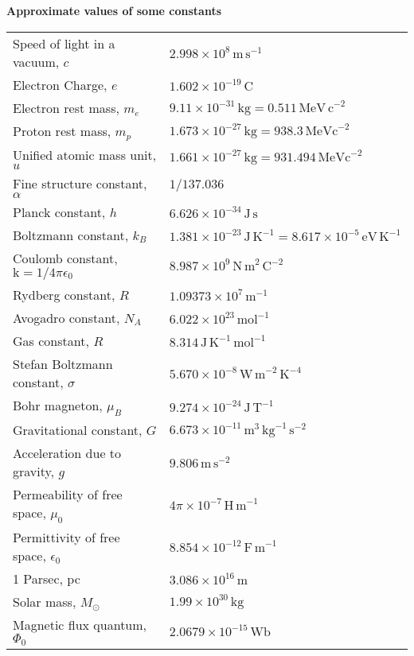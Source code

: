 \documentclass[12pt]{article}
\newcommand{\units}[1]{\ensuremath{\,\mathrm{#1}}}
\begin{document}
	
	\newpage
	\noindent\textbf{Approximate values of some constants}\\[10truept]
	{
	\begin{tabular}{l@{\hspace{1.0truecm}}l}
		Speed of light in a vacuum, $c$ & $2.998\times10^8\units{m\,s}^{-1}$\\
		Electron Charge, $e$  & $1.602\times10^{-19} \units{C}$\\
		Electron rest mass,   $m_e$ & $9.11 \times10^{-31} \units{kg}=
		0.511\units{MeV\,c}^{-2}$\\
		Proton rest mass, $m_p$& $1.673 \times 10^{-27}\units{kg}   =  938.3 \units{MeV c}^{-2}$\\
		Unified atomic mass unit, $u$&   $1.661 \times 10^{-27} \units{kg}  =  931.494
		\units{MeV c}^{-2}$\\
		Fine structure constant, $\alpha$ & $1/137.036  $\\
		Planck constant, $h$ & $6.626 \times 10^{-34}\units{J\,s}$\\
		Boltzmann constant, $k_B$ & $1.381 \times 10^{-23}\units{J\,K}^{-1} =  8.617
		\times 10^{-5}\units{eV\,K}^{-1}$\\
		Coulomb constant, $\mathrm{k}=1/4\pi\epsilon_0$ & $8.987 \times 10^9\units{N\,m}^2\units{C}^{-2}$\\
		Rydberg constant, $R$& $1.09373 \times 10^7 \units{m}^{-1}$\\
		Avogadro constant, $N_A$& $6.022 \times 10^{23} \units{mol}^{-1}$\\
		Gas constant, $R$&$8.314\units{J\,K}^{-1}\units{mol}^{-1}$\\
		Stefan Boltzmann constant, $\sigma$ & $5.670 \times 10^{-8}\units{W\,m}^{-2}\units{K}^{-4}$\\
		Bohr magneton, $\mu_B$& $9.274 \times 10^{-24}\units{J\,T}^{-1}$\\
		Gravitational constant, $ G$& $6.673 \times
		10^{-11}\units{m}^3\units{kg}^{-1}\units{s}^{-2}$\\
		Acceleration due to gravity, $g$& $9.806\units{m\,s}^{-2}$\\
		Permeability of free space, $\mu_0$ & $4\pi\times  10^{-7}\units{H\,m}^{-1}$\\
		Permittivity of free space, $\epsilon_0$& $8.854 \times
		10^{-12}\units{F\,m}^{-1}$\\
		1 Parsec, pc   &$3.086 \times 10^{16}\units{m}$\\
		Solar mass, $M_{\odot}$& $1.99  \times 10^{30}\units{kg}$\\
		Magnetic flux quantum, $\Phi_0$&$2.0679\times 10^{-15}\units{Wb}$
	\end{tabular}
	\vspace{1.5cm}
	
}
\end{document}
